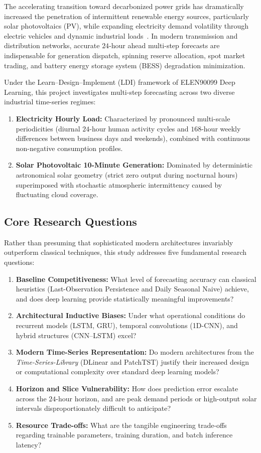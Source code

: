 \documentclass[11pt,a4paper]{article}
\begin{document}
The accelerating transition toward decarbonized power grids has dramatically increased the penetration of intermittent renewable energy sources, particularly solar photovoltaics (PV), while expanding electricity demand volatility through electric vehicles and dynamic industrial loads~\cite{box2015time, zhang2014review}. In modern transmission and distribution networks, accurate $24$-hour ahead multi-step forecasts are indispensable for generation dispatch, spinning reserve allocation, spot market trading, and battery energy storage system (BESS) degradation minimization.

Under the Learn--Design--Implement (LDI) framework of ELEN90099 Deep Learning, this project investigates multi-step forecasting across two diverse industrial time-series regimes:
\begin{enumerate}
    \item \textbf{Electricity Hourly Load:} Characterized by pronounced multi-scale periodicities (diurnal $24$-hour human activity cycles and $168$-hour weekly differences between business days and weekends), combined with continuous non-negative consumption profiles.
    \item \textbf{Solar Photovoltaic 10-Minute Generation:} Dominated by deterministic astronomical solar geometry (strict zero output during nocturnal hours) superimposed with stochastic atmospheric intermittency caused by fluctuating cloud coverage.
\end{enumerate}

\subsection{Core Research Questions}
Rather than presuming that sophisticated modern architectures invariably outperform classical techniques, this study addresses five fundamental research questions:
\begin{enumerate}
    \item \textbf{Baseline Competitiveness:} What level of forecasting accuracy can classical heuristics (Last-Observation Persistence and Daily Seasonal Naive) achieve, and does deep learning provide statistically meaningful improvements?
    \item \textbf{Architectural Inductive Biases:} Under what operational conditions do recurrent models (LSTM, GRU), temporal convolutions (1D-CNN), and hybrid structures (CNN--LSTM) excel?
    \item \textbf{Modern Time-Series Representation:} Do modern architectures from the \textit{Time-Series-Library} (DLinear and PatchTST) justify their increased design or computational complexity over standard deep learning models?
    \item \textbf{Horizon and Slice Vulnerability:} How does prediction error escalate across the $24$-hour horizon, and are peak demand periods or high-output solar intervals disproportionately difficult to anticipate?
    \item \textbf{Resource Trade-offs:} What are the tangible engineering trade-offs regarding trainable parameters, training duration, and batch inference latency?
\end{enumerate}
\end{document}
